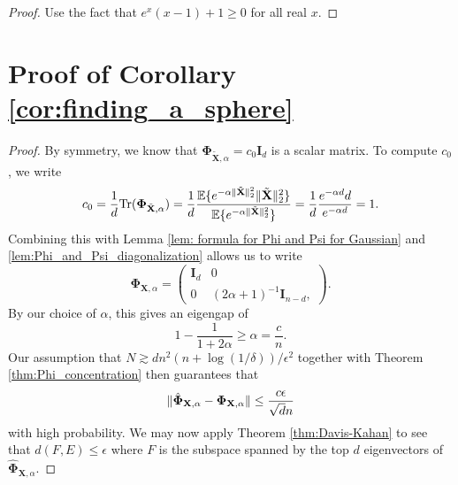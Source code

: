 \documentclass[final,12pt]{colt2018} %
\numberwithin{equation}{section}
\DeclarePairedDelimiter{\norm}{\lVert}{\rVert}
\DeclarePairedDelimiter{\braces}{\lbrace}{\rbrace}
\newcommand{\E}{\mathbb{E}}
\newcommand{\boldPhi}{\boldsymbol{\Phi}}
\newcommand{\boldI}{\textbf{I}}
\newcommand{\boldX}{\textbf{X}}
\newcommand{\Tr}{\textnormal{Tr}}
\begin{document}
\begin{proof}
	Use the fact that $e^x(x-1)+1 \geq 0$ for all real $x$.
\end{proof}

\section{Proof of Corollary \ref{cor:finding_a_sphere}} \label{sec:finding_a_sphere}

\begin{proof}
	By symmetry, we know that $\boldPhi_{\tilde{\boldX},\alpha} = c_0 \boldI_d$ is a scalar matrix. To compute $c_0$, we write
	\begin{equation*}
	c_0 = \frac{1}{d}\Tr(\boldPhi_{\tilde{\boldX},\alpha}) = \frac{1}{d} \frac{\E\braces{e^{-\alpha\norm{\tilde{\boldX}}_2^2}\norm{\tilde{\boldX}}_2^2}}{\E\braces{e^{-\alpha\norm{\tilde{\boldX}}_2^2}}} = \frac{1}{d} \frac{e^{-\alpha d}d}{e^{-\alpha d}} = 1.
	\end{equation*}
	Combining this with Lemma \ref{lem: formula for Phi and Psi for Gaussian} and \ref{lem:Phi_and_Psi_diagonalization} allows us to write
	\begin{equation*}
	\boldPhi_{\boldX,\alpha} = \left(
	\begin{array}{c|c}
	\boldI_d & 0 \\
	\hline
	0 & (2\alpha+1)^{-1}\boldI_{n-d},
	\end{array}
	\right).
	\end{equation*}
	By our choice of $\alpha$, this gives an eigengap of
	\begin{equation*}
	1 - \frac{1}{1+2\alpha} \geq \alpha = \frac{c}{n}.
	\end{equation*}
	Our assumption that $N \gtrsim dn^2(n+\log(1/\delta))/\epsilon^2$ together with Theorem \ref{thm:Phi_concentration} then guarantees that
	\begin{equation} \label{eq:Phi_deviation_for_sphere}
	\norm{\hat{\boldPhi}_{\boldX,\alpha} - \boldPhi_{\boldX,\alpha}} \leq \frac{c\epsilon}{\sqrt{d}n}
	\end{equation}
	with high probability. We may now apply Theorem \ref{thm:Davis-Kahan} to see that $d(F,E) \leq \epsilon$ where $F$ is the subspace spanned by the top $d$ eigenvectors of $\hat{\boldPhi}_{\boldX,\alpha}$.
	

\end{proof}
\end{document}
